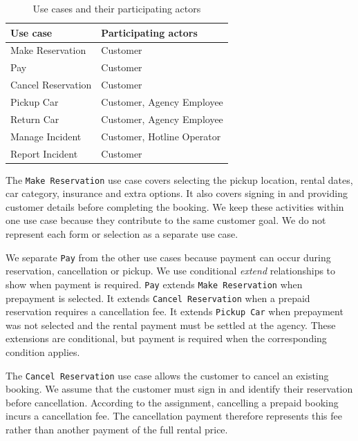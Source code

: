 \documentclass[12pt,a4paper]{report}
\begin{document}
\begin{table}[h]
    \centering
    \begin{tabularx}{\textwidth}{|l|X|}
        \hline
        \textbf{Use case} & \textbf{Participating actors} \\
        \hline
        Make Reservation & Customer \\
        \hline
        Pay & Customer\\
        \hline
        Cancel Reservation & Customer \\
        \hline
        Pickup Car & Customer, Agency Employee \\
        \hline
        Return Car & Customer, Agency Employee \\
        \hline
        Manage Incident & Customer, Hotline Operator \\
        \hline
        Report Incident & Customer \\
        \hline
    \end{tabularx}
\caption{Use cases and their participating actors}
\end{table}
The \texttt{Make Reservation} use case covers selecting the pickup location, rental dates, car category, insurance and extra options. It also covers signing in and providing customer details before completing the booking. We keep these activities within one use case because they contribute to the same customer goal. We do not represent each form or selection as a separate use case.

We separate \texttt{Pay} from the other use cases because payment can occur during reservation, cancellation or pickup. We use conditional \emph{extend} relationships to show when payment is required. \texttt{Pay} extends \texttt{Make Reservation} when prepayment is selected. It extends \texttt{Cancel Reservation} when a prepaid reservation requires a cancellation fee. It extends \texttt{Pickup Car} when prepayment was not selected and the rental payment must be settled at the agency.
These extensions are conditional, but payment is required when the corresponding condition applies.

The \texttt{Cancel Reservation} use case allows the customer to cancel an existing booking. We assume that the customer must sign in and identify their reservation before cancellation. According to the assignment, cancelling a prepaid booking incurs a cancellation fee. The cancellation payment therefore represents this fee rather than another payment of the full rental price.
\end{document}
